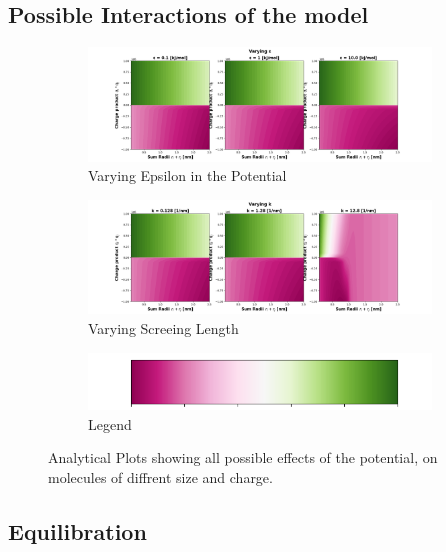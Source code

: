 \documentclass[draft, english]{volcanica-template}
\begin{document}
\subsection{Possible Interactions of the model}

\begin{figure}[!htbp]
\centering
\begin{figure}[!htbp]
\centering
\includegraphics[width=0.7\linewidth]{files/varying_epsilon-810f807f02d75c73decbca2fe2f94429.png}
\caption[]{Varying Epsilon in the Potential}
\label{Fig2}
\end{figure}

\begin{figure}[!htbp]
\centering
\includegraphics[width=0.7\linewidth]{files/varying_k-1807ae5f28d378c793fe1708676a40de.png}
\caption[]{Varying Screeing Length}
\label{Fig2_PotentialPlot-b}
\end{figure}

\begin{figure}[!htbp]
\centering
\includegraphics[width=0.7\linewidth]{files/colorbar-16a5ebb9ef94b55be3e7be0521e48a9d.png}
\caption[]{Legend}
\label{Fig2_PotentialPlot-c}
\end{figure}
\caption[]{Analytical Plots showing all possible effects of the potential, on molecules of diffrent size and charge.}
\label{Fig2_PotentialPlot-c}
\end{figure}

\subsection{Equilibration}
\end{document}
